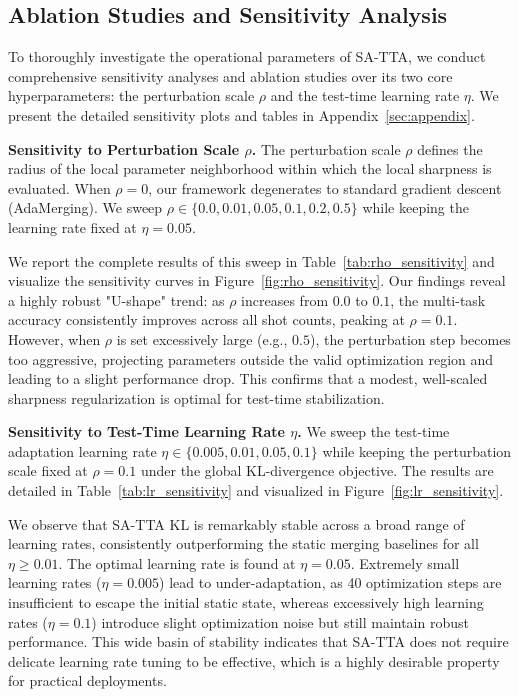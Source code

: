 \documentclass{article}
\theoremstyle{plain}
\theoremstyle{definition}
\theoremstyle{remark}
\begin{document}
\subsection{Ablation Studies and Sensitivity Analysis}
\label{subsec:sensitivity}

To thoroughly investigate the operational parameters of SA-TTA, we conduct comprehensive sensitivity analyses and ablation studies over its two core hyperparameters: the perturbation scale $\rho$ and the test-time learning rate $\eta$. We present the detailed sensitivity plots and tables in Appendix~\ref{sec:appendix}.

\textbf{Sensitivity to Perturbation Scale $\rho$.} 
The perturbation scale $\rho$ defines the radius of the local parameter neighborhood within which the local sharpness is evaluated. When $\rho = 0$, our framework degenerates to standard gradient descent (AdaMerging). We sweep $\rho \in \{0.0, 0.01, 0.05, 0.1, 0.2, 0.5\}$ while keeping the learning rate fixed at $\eta = 0.05$. 

We report the complete results of this sweep in Table~\ref{tab:rho_sensitivity} and visualize the sensitivity curves in Figure~\ref{fig:rho_sensitivity}. Our findings reveal a highly robust "U-shape" trend: as $\rho$ increases from $0.0$ to $0.1$, the multi-task accuracy consistently improves across all shot counts, peaking at $\rho = 0.1$. However, when $\rho$ is set excessively large (e.g., $0.5$), the perturbation step becomes too aggressive, projecting parameters outside the valid optimization region and leading to a slight performance drop. This confirms that a modest, well-scaled sharpness regularization is optimal for test-time stabilization.

\textbf{Sensitivity to Test-Time Learning Rate $\eta$.}
We sweep the test-time adaptation learning rate $\eta \in \{0.005, 0.01, 0.05, 0.1\}$ while keeping the perturbation scale fixed at $\rho = 0.1$ under the global KL-divergence objective. The results are detailed in Table~\ref{tab:lr_sensitivity} and visualized in Figure~\ref{fig:lr_sensitivity}. 

We observe that SA-TTA KL is remarkably stable across a broad range of learning rates, consistently outperforming the static merging baselines for all $\eta \ge 0.01$. The optimal learning rate is found at $\eta = 0.05$. Extremely small learning rates ($\eta = 0.005$) lead to under-adaptation, as 40 optimization steps are insufficient to escape the initial static state, whereas excessively high learning rates ($\eta = 0.1$) introduce slight optimization noise but still maintain robust performance. This wide basin of stability indicates that SA-TTA does not require delicate learning rate tuning to be effective, which is a highly desirable property for practical deployments.
\end{document}
